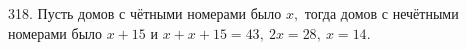 318. Пусть домов с чётными номерами было $x,$ тогда домов с нечётными номерами было $x+15$ и $x+x+15=43,\ 2x=28,\ x=14.$\\
